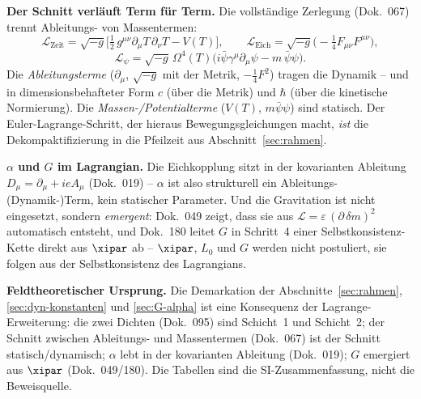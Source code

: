 \textbf{Der Schnitt verläuft Term für Term.} Die vollständige Zerlegung (Dok.~067)
trennt Ableitungs- von Massentermen:
\[
  \mathcal{L}_{\text{Zeit}} = \sqrt{-g}\Big[\tfrac{1}{2}\,g^{\mu\nu}\partial_\mu T\,\partial_\nu T - V(T)\Big],
  \qquad
  \mathcal{L}_{\text{Eich}} = \sqrt{-g}\big(-\tfrac{1}{4}F_{\mu\nu}F^{\mu\nu}\big),
\]
\[
  \mathcal{L}_\psi = \sqrt{-g}\,\Omega^4(T)\big(i\bar\psi\gamma^\mu\partial_\mu\psi - m\,\bar\psi\psi\big).
\]
Die \emph{Ableitungsterme} ($\partial_\mu$, $\sqrt{-g}$ mit der Metrik,
$-\tfrac14 F^2$) tragen die Dynamik -- und in dimensionsbehafteter Form $c$ (über
die Metrik) und $\hbar$ (über die kinetische Normierung). Die
\emph{Massen-/Potentialterme} ($V(T)$, $m\bar\psi\psi$) sind statisch. Der
Euler-Lagrange-Schritt, der hieraus Bewegungsgleichungen macht, \emph{ist} die
Dekompaktifizierung in die Pfeilzeit aus Abschnitt~\ref{sec:rahmen}.

\textbf{$\alpha$ und $G$ im Lagrangian.} Die Eichkopplung sitzt in der kovarianten
Ableitung $D_\mu = \partial_\mu + ieA_\mu$ (Dok.~019) -- $\alpha$ ist also
strukturell ein Ableitungs-(Dynamik-)Term, kein statischer Parameter. Und die
Gravitation ist nicht eingesetzt, sondern \emph{emergent}: Dok.~049 zeigt, dass sie
aus $\mathcal{L} = \varepsilon\,(\partial\,\delta m)^2$ automatisch entsteht, und
Dok.~180 leitet $G$ in Schritt~4 einer Selbstkonsistenz-Kette direkt aus $\xipar$
ab -- $\xipar$, $L_0$ und $G$ werden nicht postuliert, sie folgen aus der
Selbstkonsistenz des Lagrangians.

\begin{result}
\textbf{Feldtheoretischer Ursprung.} Die Demarkation der
Abschnitte~\ref{sec:rahmen}, \ref{sec:dyn-konstanten} und \ref{sec:G-alpha} ist
eine Konsequenz der Lagrange-Erweiterung: die zwei Dichten (Dok.~095) sind
Schicht~1 und Schicht~2; der Schnitt zwischen Ableitungs- und Massentermen
(Dok.~067) ist der Schnitt statisch/dynamisch; $\alpha$ lebt in der kovarianten
Ableitung (Dok.~019); $G$ emergiert aus $\xipar$ (Dok.~049/180). Die Tabellen sind
die SI-Zusammenfassung, nicht die Beweisquelle.
\end{result}
